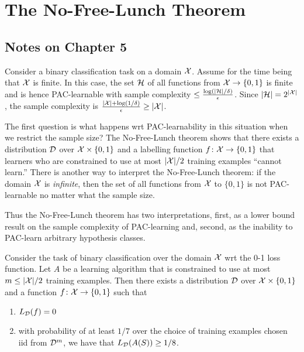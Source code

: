 \chapter{The No-Free-Lunch Theorem}

\section*{Notes on Chapter 5}

Consider a binary classification task on a domain $\mathcal{X}$. Assume for the time
being that $\mathcal{X}$ is finite. In this case, the set $\mathcal{H}$ of all functions
from $\mathcal{X} \rightarrow \{0, 1\}$ is finite and is hence PAC-learnable with
sample complexity $\leq \frac{\log (|\mathcal{H}| / \delta)}{\epsilon}$.  Since
$|\mathcal{H}| = 2^{|\mathcal{X}|}$, the sample complexity is $\frac{|\mathcal{X}| + \log (1 /
\delta)}{\epsilon} \geq |\mathcal{X}|$.

The first question is what happens wrt PAC-learnability in this situation when
we restrict the sample size? The No-Free-Lunch theorem shows that there exists
a distribution $\mathcal{D}$ over $\mathcal{X} \times \{0, 1\}$ and a labelling function $f
\colon \mathcal{X} \rightarrow \{0, 1\}$ that learners who are  constrained to use at
most $|\mathcal{X}| / 2$ training examples ``cannot learn.'' There is another way to
interpret the No-Free-Lunch theorem: if the domain $\mathcal{X}$ is \emph{infinite},
then the set of all functions from $\mathcal{X}$ to $\{0, 1\}$ is not PAC-learnable no
matter what the sample size.  

Thus the No-Free-Lunch theorem has two interpretations, first, as a lower bound
result on the sample complexity of PAC-learning and, second, as the inability
to PAC-learn arbitrary hypothesis classes.    

\begin{theorem}
\label{thm:no_free_lunch}
Consider the task of binary classification over the domain $\mathcal{X}$ wrt the 0-1
loss function. Let $A$ be a learning algorithm that is constrained to use at
most $m \leq |\mathcal{X}| / 2$ training examples. Then there exists a distribution
$\mathcal{D}$ over $\mathcal{X} \times \{0, 1\}$ and a function $f \colon \mathcal{X} \rightarrow
\{0, 1\}$ such that 
\begin{enumerate}
    \item $L_{\mathcal{D}} (f) = 0$
    \item with probability of at least $1/7$ over the choice of training examples 
        chosen iid from $\mathcal{D}^{m}$, we have that $L_{\mathcal{D}} (A(S)) \geq 1/ 8$.
\end{enumerate}
\end{theorem} 
